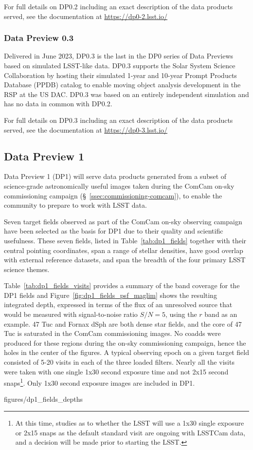 For full details on DP0.2 including an exact description of the data products served, see the documentation at \url{https://dp0-2.lsst.io/}

\subsubsection{Data Preview 0.3}
\label{sec:dp03}

Delivered in June  2023, DP0.3 is the last in the DP0 series of Data Previews based on simulated LSST-like data. 
DP0.3 supports the Solar System Science Collaboration by hosting their simulated 1-year and 10-year Prompt Products Database (PPDB) catalog to enable moving object analysis development in the RSP at the US DAC.
DP0.3 was based on an entirely independent simulation and has no data in common with DP0.2.

For full details on DP0.3 including an exact description of the data products served, see the documentation at \url{https://dp0-3.lsst.io/}

\subsection{Data Preview 1}
\label{ssec:dp1}

Data Preview 1 (DP1) will serve data products generated from a subset of science-grade astronomically useful images  taken  during  the ComCam on-sky commissioning campaign (\S~\ref{ssec:commissioning-comcam}), to enable the community to prepare to work with LSST data. 

Seven target fields observed as part of the ComCam on-sky observing campaign  have been selected as the basis for DP1 due to their quality and scientific usefulness.  
These seven fields, listed in Table~\ref{tab:dp1_fields} together with their central pointing coordinates, span a range of stellar densities, have good overlap with external reference datasets, and span the breadth of the four primary LSST science themes. 


Table~\ref{tab:dp1_fields_visits} provides a summary of the band coverage for the DP1 fields and Figure~\ref{fig:dp1_fields_psf_maglim} shows the
resulting integrated depth, expressed in terms of the flux of an unresolved source that would be measured with signal-to-noise ratio $S/N = 5$, using the $r$ band as an example.
47 Tuc and Fornax dSph are both dense star fields, and the core of 47 Tuc is saturated in the ComCam commissioning images.
No coadds were produced for these regions during the on-sky commissioning campaign, hence the holes in the center of the figures.
A typical observing epoch on a given target field consisted of 5-20 visits in each of the three loaded filters.
Nearly all the visits  were taken with one single 1x30 second exposure time and not  2x15 second snaps\footnote{At this time, studies as to whether the LSST will use a 1x30 single exposure or 2x15 snaps as the default standard visit are ongoing with LSSTCam data, and a decision will be made prior to starting the LSST. }.
Only 1x30 second exposure images are included in DP1.

 {figures/dp1_fields_depths}

